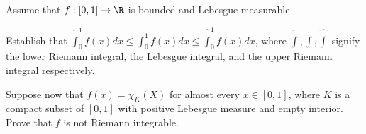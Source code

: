 Assume that $f:[0,1]\rightarrow \R$ is bounded and Lebesgue measurable
\begin{alist}
\item Establish that 
$\check{\int}_0^1 f(x)dx \leq \int_0^1 f(x)dx \leq \hat{\int}_0^1
f(x)dx$, where $\check{\int}, \int,\hat{\int}$ signify the lower
Riemann integral, the Lebesgue integral, and the upper Riemann
integral respectively.
\item Suppose now that $f(x)=\chi_K(X)$ for almost every $x\in [0,1]$, 
where $K$ is a compact subset of $[0,1]$ with positive Lebesgue
measure and empty interior. Prove that $f$ is not Riemann integrable.
\end{alist}
